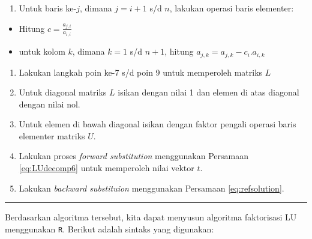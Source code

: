 \documentclass[
]{book}
\providecommand{\tightlist}{%
  \setlength{\itemsep}{0pt}\setlength{\parskip}{0pt}}
\theoremstyle{definition}
\theoremstyle{definition}
\theoremstyle{definition}
\theoremstyle{definition}
\theoremstyle{remark}
\begin{document}
\begin{enumerate}
\def\labelenumi{\arabic{enumi}.}
\setcounter{enumi}{4}
\tightlist
\item
  Untuk baris ke-\(j\), dimana \(j=i+1\) s/d \(n\), lakukan operasi baris elementer:
\end{enumerate}

\begin{itemize}
\tightlist
\item
  Hitung \(c=\frac{a_{j,i}}{a_{i,i}}\)
\item
  untuk kolom \(k\), dimana \(k=1\) s/d \(n+1\), hitung \(a_{j,k}=a_{j,k}-c_i.a_{i,k}\)
\end{itemize}

\begin{enumerate}
\def\labelenumi{\arabic{enumi}.}
\setcounter{enumi}{5}
\tightlist
\item
  Lakukan langkah poin ke-7 s/d poin 9 untuk memperoleh matriks \(L\)
\item
  Untuk diagonal matriks \(L\) isikan dengan nilai 1 dan elemen di atas diagonal dengan nilai nol.
\item
  Untuk elemen di bawah diagonal isikan dengan faktor pengali operasi baris elementer matriks \(U\).
\item
  Lakukan proses \emph{forward substitution} menggunakan Persamaan \eqref{eq:LUdecomp6} untuk memperoleh nilai vektor \(t\).
\item
  Lakukan \emph{backward substituion} menggunakan Persamaan \eqref{eq:refsolution}.
\end{enumerate}

\begin{center}\rule{0.5\linewidth}{0.5pt}\end{center}

Berdasarkan algoritma tersebut, kita dapat menyusun algoritma faktorisasi LU menggunakan \texttt{R}. Berikut adalah sintaks yang digunakan:
\end{document}
